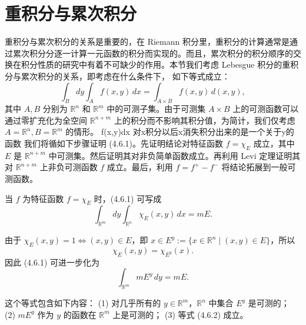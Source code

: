 \documentclass[lang=cn,10pt]{elegantbook}
\begin{document}
\section{重积分与累次积分}
重积分与累次积分的关系是重要的，在 Riemann 积分里，重积分的计算通常是通过累次积分分逐一计算一元函数的积分而实现的。而且，累次积分的积分顺序的交换在积分性质的研究中有着不可缺少的作用。本节我们考虑 Lebesgue 积分的重积分与累次积分的关系，即考虑在什么条件下， 如下等式成立：
\[
\int_B dy \int_A f(x,y)\,dx 
= \int_{A \times B} f(x,y)\,d(x,y),
\tag{4.6.1}
\]
其中 $A,B$ 分别为 $\mathbb{R}^n$ 和 $\mathbb{R}^m$ 中的可测子集。由于可测集 $A \times B$ 上的可测函数可以通过零扩充化为全空间 $\mathbb{R}^{n+m}$ 上的积分而不影响其积分值，为简计，我们仅考虑 $A = \mathbb{R}^n, B = \mathbb{R}^m$ 的情形。
f(x,y)dx 对x积分以后x消失积分出来的是一个关于y的函数
我们将循如下步骤证明 (4.6.1)。先证明结论对特征函数 
$f = \chi_E$ 成立，其中 $E$ 是 $\mathbb{R}^{n+m}$ 中可测集。然后证明其对非负简单函数成立。再利用 Levi 定理证明其对 $\mathbb{R}^{n+m}$ 上非负可测函数 $f$ 成立。最后，利用 $f = f^+ - f^-$ 将结论拓展到一般可测函数。

当 $f$ 为特征函数 $f = \chi_E$ 时，(4.6.1) 可写成
\[
\int_{\mathbb{R}^m} dy \int_{\mathbb{R}^n} \chi_E(x,y) \, dx = mE.
\]

由于 $\chi_E(x,y) = 1 \iff (x,y) \in E$，即 $x \in E^y := \{x \in \mathbb{R}^n \mid (x,y)\in E\}$，所以
\[
\chi_E(x,y) = \chi_{E^y}(x).
\]
因此 (4.6.1) 可进一步化为
\[
\int_{\mathbb{R}^m} mE^y \, dy = mE. \tag{4.6.2}
\]

这个等式包含如下内容：  
(1) 对几乎所有的 $y \in \mathbb{R}^m$，$\mathbb{R}^n$ 中集合 $E^y$ 是可测的；  
(2) $mE^y$ 作为 $y$ 的函数在 $\mathbb{R}^m$ 上是可测的；  
(3) 等式 (4.6.2) 成立。  
\end{document}
